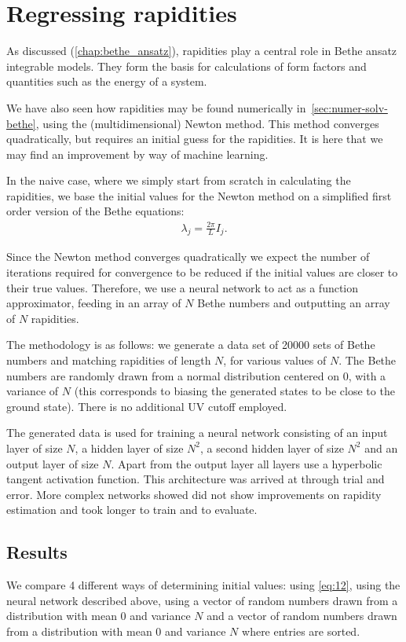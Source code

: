 \documentclass[11pt, a4paper]{report} %
\begin{document}
\section{Regressing rapidities}

As discussed (\cref{chap:bethe_ansatz}), rapidities play a central role in Bethe ansatz integrable models.
They form the basis for calculations of form factors and quantities such as the energy of a system.

We have also seen how rapidities may be found numerically in~\cref{sec:numer-solv-bethe}, using the (multidimensional) Newton method.
This method converges quadratically, but requires an initial guess for the rapidities.
It is here that we may find an improvement by way of machine learning.

In the naive case, where we simply start from scratch in calculating the rapidities, we base the initial values for the Newton method on a simplified first order version of the Bethe equations:
\begin{align}
  \label{eq:12}
  \lambda_j = \frac{2\pi}{L} I_j.
\end{align}

Since the Newton method converges quadratically we expect the number of iterations required for convergence to be reduced if the initial values are closer to their true values.
Therefore, we use a neural network to act as a function approximator, feeding in an array of \(N\) Bethe numbers and outputting an array of \(N\) rapidities.

The methodology is as follows: we generate a data set of 20000 sets of Bethe numbers and matching rapidities of length \(N\), for various values of \(N\).
The Bethe numbers are randomly drawn from a normal distribution centered on 0, with a variance of \(N\) (this corresponds to biasing the generated states to be close to the ground state).
There is no additional UV cutoff employed.

The generated data is used for training a neural network consisting of an input layer of size \(N\), a hidden layer of size \(N^2\), a second hidden layer of size \(N^2\) and an output layer of size \(N\).
Apart from the output layer all layers use a hyperbolic tangent activation function.
This architecture was arrived at through trial and error.
More complex networks showed did not show improvements on rapidity estimation and took longer to train and to evaluate.

\subsection{Results}
We compare 4 different ways of determining initial values: using \cref{eq:12}, using the neural network described above, using a vector of random numbers drawn from a distribution with mean 0 and variance \(N\) and a vector of random numbers drawn from a distribution with mean 0 and variance \(N\) where entries are sorted.
\end{document}

